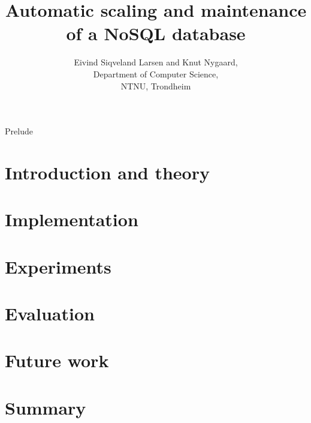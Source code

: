 \documentclass[a4paper, 12pt]{report}
\title{Automatic scaling and maintenance of a NoSQL database}
\author{Eivind Siqveland Larsen and Knut Nygaard,\\
        Department of Computer Science,\\
        NTNU,
        Trondheim}
\begin{document}
\maketitle
\thispagestyle{empty}

\clearpage


\clearpage


\clearpage


\begin{titlepage}\centering
\vspace*{\fill}
\LARGE Prelude
\vspace*{\fill}
\end{titlepage}
\clearpage


\clearpage

\clearpage

\tableofcontents
\clearpage

\listoffigures
\clearpage
\setcounter{page}{1}
\chapter{Introduction and theory}
\label{chapter:introduction}


\clearpage


\clearpage


\clearpage


\clearpage



\clearpage


\clearpage

\chapter{Implementation}
\label{chapter:implementation}

\clearpage

\chapter{Experiments}
\label{chapter:results}



\chapter{Evaluation}
\label{chapter:evaluation}


\chapter{Future work}
\label{chapter:futurework}


\chapter{Summary}
\label{chapter:summary}




\end{document}
